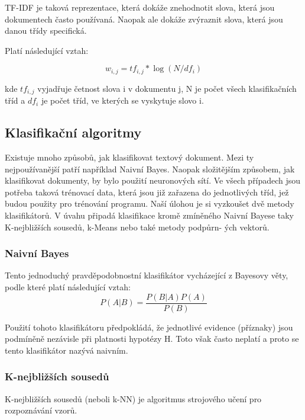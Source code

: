 \documentclass[ 12pt, a4paper]{article}
\begin{document}
TF-IDF je taková reprezentace, která dokáže znehodnotit slova, která jsou dokumentech často používaná. Naopak ale dokáže zvýraznit slova, která jsou danou třídy specifická.

Platí následující vztah:

\begin{equation*}
	w_{i,j} = tf_{i,j} * \log(N/df_{i}) 
\end{equation*}


kde $tf_{i,j}$ vyjadřuje četnost slova i v dokumentu j, N je počet všech klasifikačních tříd a $df_i$ je počet tříd, ve kterých se vyskytuje slovo i.


\subsection{Klasifikační algoritmy}
Existuje mnoho způsobů, jak klasifikovat textový dokument. Mezi ty nejpoužívanější patří například Naivní Bayes. Naopak složitějším způsobem, jak klasifikovat dokumenty, by bylo použití neuronových sítí. Ve všech případech jsou potřeba taková trénovací data, která jsou již zařazena do jednotlivých tříd, jež budou použity pro trénování programu. 
Naší úlohou je si vyzkoušet dvě metody klasifikátorů. V úvahu připadá klasifikace kromě zmíněného Naivní Bayese taky K-nejbližších sousedů, k-Means nebo také metody podpůrn- ých vektorů. 

\subsubsection{Naivní Bayes}

Tento jednoduchý pravděpodobnostní klasifikátor vycházející z Bayesovy věty, podle které platí následující vztah:
\begin{equation*}
P(A | B) = \frac{P(B|A)P(A)}{P(B)}
\end{equation*}

Použití tohoto klasifikátoru předpokládá, že jednotlivé evidence (příznaky) jsou podmíněně nezávisle při platnosti hypotézy H. Toto však často neplatí a proto se tento klasifikátor nazývá naivním.


\subsubsection{K-nejbližších sousedů}

K-nejbližších sousedů (neboli k-NN) je algoritmus strojového učení pro rozpoznávání vzorů.
\end{document}
